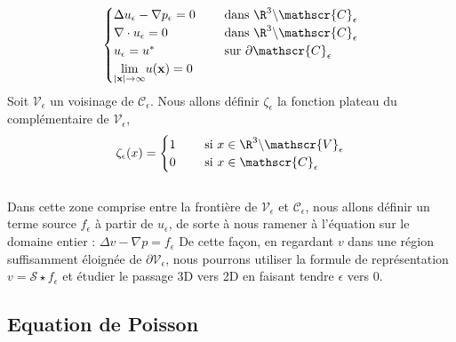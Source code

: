 $$\begin{cases}
    \Delta u_{\epsilon} - \nabla p_{\epsilon} = 0 \quad &\text{ dans } \R^3 \backslash \mathscr{C}_{\epsilon} \\
    \nabla \cdot u_{\epsilon} = 0 &\text{ dans } \R^3 \backslash \mathscr{C}_{\epsilon} \\
    u_{\epsilon} = u^* &\text{ sur } \partial \mathscr{C}_{\epsilon} \\
    \underset{|\mathbf{x}| \to \infty}{\lim} u(\mathbf{x}) = 0
\end{cases}$$
Soit $\mathscr{V}_{\epsilon}$ un voisinage de $\mathscr{C}_{\epsilon}$. Nous allons définir $\zeta_{\epsilon}$ la fonction plateau du complémentaire de $\mathscr{V}_{\epsilon}$, 
$$\zeta_{\epsilon}(x) = \begin{cases}
    1 \quad &\text{ si } x \in \R^3 \backslash \mathscr{V}_{\epsilon} \\
    0 &\text{ si } x \in \mathscr{C}_{\epsilon}
\end{cases} $$ \\
Dans cette zone comprise entre la frontière de $\mathscr{V}_{\epsilon}$ et $\mathscr{C}_{\epsilon}$, nous allons définir un terme source $f_{\epsilon}$ à partir de $u_{\epsilon}$, de sorte à nous ramener à l'équation sur le domaine entier : $\Delta v - \nabla p = f_{\epsilon}$
De cette façon, en regardant $v$ dans une région suffisamment éloignée de $\partial \mathscr{V}_{\epsilon}$, nous pourrons utiliser la formule de représentation $v = \mathscr{S} \star f_{\epsilon}$ et étudier le passage 3D vers 2D en faisant tendre $\epsilon$ vers 0.



\subsection{Equation de Poisson}

